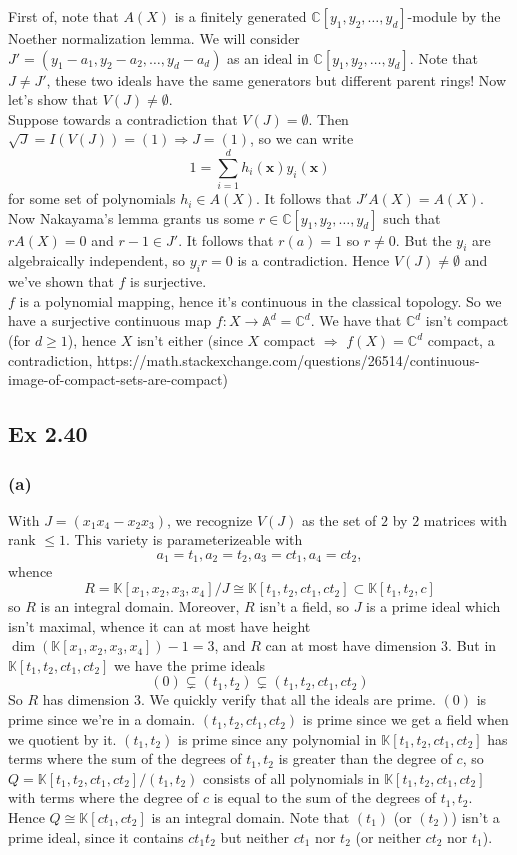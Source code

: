 \documentclass{article}
\theoremstyle{definition}
\newcommand{\C}{\mathbb{C}}
\newcommand{\K}{\mathbb{K}}
\newcommand{\A}{\mathbb{A}}
\newcommand{\x}{\bm{x}}
\begin{document}
First of, note that $A(X)$ is a finitely generated $\C[y_1, y_2, \ldots,
y_d]$-module by the Noether normalization lemma. We will consider $J' = (y_1 -
a_1, y_2 - a_2, \ldots, y_d - a_d)$ as an ideal in $\C[y_1, y_2, \ldots, y_d]$.
Note that $J \not = J'$, these two ideals have the same generators but
different parent rings! Now let's show that $V(J) \not = \emptyset$. \\

Suppose towards a contradiction that $V(J) = \emptyset$. Then $\sqrt{J} =
I(V(J)) = (1) \Rightarrow J = (1)$, so we can write 
\[
	1 = \sum_{i = 1}^{d} h_i(\x)y_i(\x)
\] 
for some set of polynomials $h_i \in A(X)$. It follows that $J'A(X) = A(X)$.
Now Nakayama's lemma grants us some $r \in \C[y_1, y_2, \ldots, y_d]$ such that
$rA(X) = 0$ and $r - 1 \in J'$. It follows that $r(a) = 1$ so $r \not = 0$. But
the $y_i$ are algebraically independent, so $y_i r = 0$ is a contradiction.
Hence $V(J) \not = \emptyset$ and we've shown that $f$ is surjective. \\

$f$ is a polynomial mapping, hence it's continuous in the classical topology.
So we have a surjective continuous map $f: X \to \A^{d} = \C^{d}$. We have that
$\C^{d}$ isn't compact (for $d \geq 1$), hence $X$ isn't either (since $X$
compact $\Rightarrow$ $f(X) = \C^{d}$ compact, a contradiction,
https://math.stackexchange.com/questions/26514/continuous-image-of-compact-sets-are-compact)


\subsection*{Ex 2.40} 

\subsubsection*{(a)} 

With $J = (x_1x_4 - x_2x_3)$, we recognize $V(J)$ as the set of $2$ by $2$
matrices with rank $\leq 1$. This variety is parameterizeable with 
\[
	a_1 = t_1, a_2 = t_2, a_3 = c t_1, a_4 = c t_2,
\] 
whence
\[
	R = \K[x_1, x_2, x_3, x_4]/J \cong \K[t_1, t_2, ct_1, ct_2] \subset \K[t_1, t_2, c]
\] 
so $R$ is an integral domain. Moreover, $R$ isn't a field, so $J$ is a prime
ideal which isn't maximal, whence it can at most have height $\dim(\K[x_1, x_2,
x_3, x_4]) - 1 = 3$, and $R$ can at most have dimension $3$. But in $\K[t_1,
t_2, ct_1, ct_2]$ we have the prime ideals 
\[
	(0) \subsetneq (t_1, t_2) \subsetneq (t_1, t_2, ct_1, ct_2)
\] 
So $R$ has dimension $3$. We quickly verify that all the ideals are prime.
$(0)$ is prime since we're in a domain. $(t_1, t_2, ct_1, ct_2)$ is prime since
we get a field when we quotient by it. $(t_1, t_2)$ is prime since any
polynomial in $\K[t_1, t_2, ct_1, ct_2]$ has terms where the sum of the degrees
of $t_1, t_2$ is greater than the degree of $c$, so $Q = \K[t_1, t_2, ct_1,
ct_2]/(t_1, t_2)$ consists of all polynomials in $\K[t_1, t_2, ct_1, ct_2]$
with terms where the degree of $c$ is equal to the sum of the degrees of $t_1,
t_2$. Hence $Q \cong \K[ct_1, ct_2]$ is an integral domain. Note that $(t_1)$
(or $(t_{2})$) isn't a prime ideal, since it contains $ct_1t_2$ but neither
$ct_1$ nor $t_2$ (or neither $ct_2$ nor $t_1$).
\end{document}
